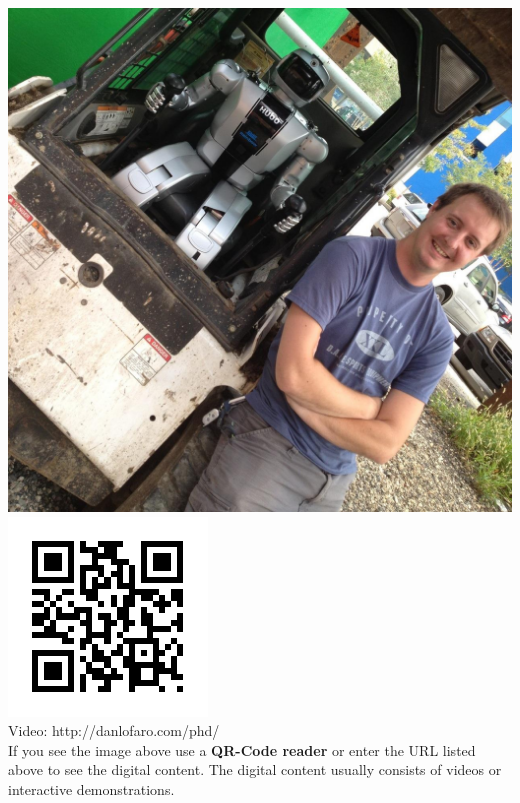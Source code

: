\vfill
\addvspace{8cm}
  \centering
      \includegraphics[width=0.5\columnwidth]{./pix/danAndHubo.jpg}\\
      \includegraphics{./qrcode/qrcode-phd.png}\\
      Video: http://danlofaro.com/phd/ \\
If you see the image above use a \textbf{QR-Code reader} or enter the URL listed above to see the digital content.  The digital content usually consists of videos or interactive demonstrations.

\vfill
